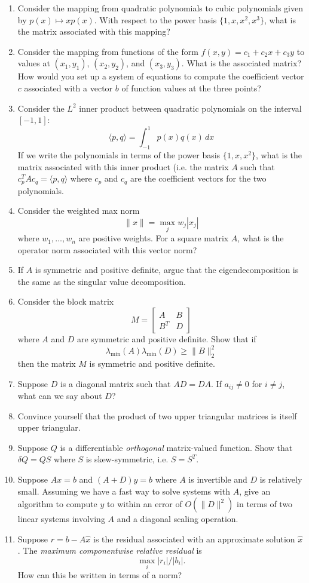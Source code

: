 \documentclass[12pt, leqno]{article}
\begin{document}
\begin{enumerate}
\item
  Consider the mapping from quadratic polynomials to cubic polynomials
  given by $p(x) \mapsto x p(x)$.  With respect to the power basis
  $\{1, x, x^2, x^3\}$, what is the matrix associated with this
  mapping?
\item
  Consider the mapping from functions of the form
  $f(x,y) = c_1 + c_2 x + c_3 y$
  to values at $(x_1,y_1)$, $(x_2,y_2)$, and $(x_3,y_3)$.
  What is the associated matrix?  How would you set up a system
  of equations to compute the coefficient vector $c$ associated
  with a vector $b$ of function values at the three points?
\item
  Consider the $L^2$ inner product between quadratic polynomials
  on the interval $[-1,1]$:
  \[
    \langle p, q \rangle = \int_{-1}^1 p(x) q(x) \, dx
  \]
  If we write the polynomials in terms of the power basis
  $\{1, x, x^2\}$, what is the matrix associated with this inner
  product (i.e. the matrix $A$ such that $c_p^T A c_q = \langle p, q
  \rangle$ where $c_p$ and $c_q$ are the coefficient vectors for
  the two polynomials.
\item
  Consider the weighted max norm
  \[
    \|x\| = \max_{j} w_j |x_j|
  \]
  where $w_1, \ldots, w_n$ are positive weights.  For a square matrix
  $A$, what is the operator norm associated with this vector norm?
\item
  If $A$ is symmetric and positive definite, argue that the
  eigendecomposition is the same as the singular value decomposition.
\item
  Consider the block matrix
  \[
    M = \begin{bmatrix} A & B \\ B^T & D \end{bmatrix}
  \]
  where $A$ and $D$ are symmetric and positive definite.  Show that if
  \[
    \lambda_{\min}(A) \lambda_{\min}(D) \geq \|B\|_2^2
  \]
  then the matrix $M$ is symmetric and positive definite.
\item
  Suppose $D$ is a diagonal matrix such that $AD = DA$.  If
  $a_{ij} \neq 0$ for $i \neq j$, what can we say about $D$?
\item
  Convince yourself that the product of two upper triangular
  matrices is itself upper triangular.
\item
  Suppose $Q$ is a differentiable {\em orthogonal} matrix-valued
  function.  Show that $\delta Q = Q S$ where $S$ is skew-symmetric,
  i.e. $S = S^T$.
\item
  Suppose $Ax = b$ and $(A+D) y = b$ where $A$ is invertible and $D$
  is relatively small.  Assuming we have a fast way to solve systems
  with $A$, give an algorithm to compute $y$ to within an error of
  $O(\|D\|^2)$ in terms of two linear systems involving $A$ and a
  diagonal scaling operation.
\item
  Suppose $r = b-A\hat{x}$ is the residual associated with an
  approximate solution $\hat{x}$.  The {\em maximum componentwise
    relative residual} is
  \[
    \max_i |r_i|/|b_i|.
  \]
  How can this be written in terms of a norm?
\end{enumerate}
\end{document}

